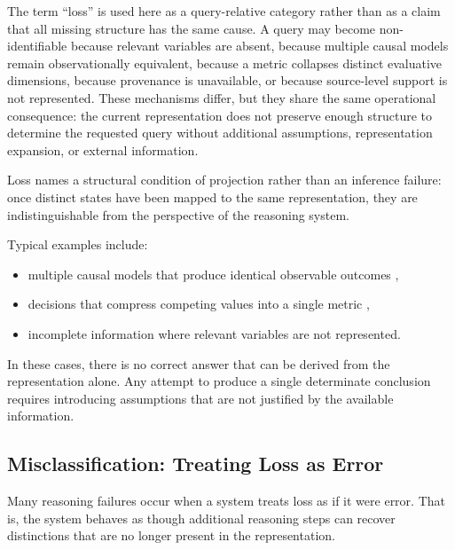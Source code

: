 \documentclass[11pt]{article}
\begin{document}
The term ``loss'' is used here as a query-relative category rather than as a claim that all missing structure has the same cause. A query may become non-identifiable because relevant variables are absent, because multiple causal models remain observationally equivalent, because a metric collapses distinct evaluative dimensions, because provenance is unavailable, or because source-level support is not represented. These mechanisms differ, but they share the same operational consequence: the current representation does not preserve enough structure to determine the requested query without additional assumptions, representation expansion, or external information.

Loss names a structural condition of projection rather than an inference failure: once distinct states have been mapped to the same representation, they are indistinguishable from the perspective of the reasoning system.

Typical examples include:
\begin{itemize}[leftmargin=1.5em]
    \item multiple causal models that produce identical observable outcomes \cite{Pearl2009},
    \item decisions that compress competing values into a single metric \cite{Savage1954},
    \item incomplete information where relevant variables are not represented.
\end{itemize}

In these cases, there is no correct answer that can be derived from the representation alone. Any attempt to produce a single determinate conclusion requires introducing assumptions that are not justified by the available information.

\subsection{Misclassification: Treating Loss as Error}

Many reasoning failures occur when a system treats loss as if it were error. That is, the system behaves as though additional reasoning steps can recover distinctions that are no longer present in the representation.
\end{document}
